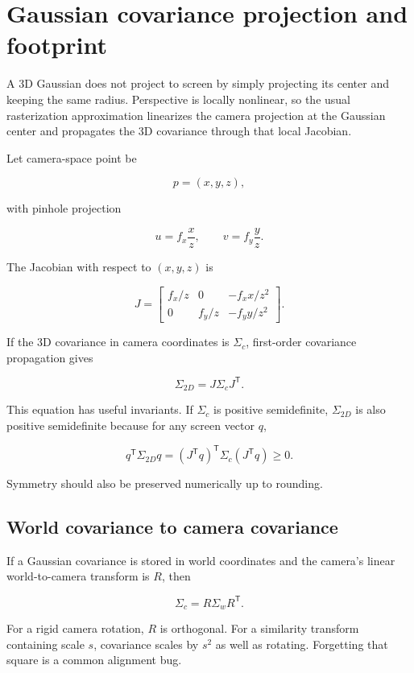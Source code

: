 \hypertarget{appendix-24269cb6977c}{}
\section{Gaussian covariance projection and footprint}\label{appendix-24269cb6977c-gaussian-covariance-projection-and-footprint}

A 3D Gaussian does not project to screen by simply projecting its center and keeping the same radius. Perspective is locally nonlinear, so the usual rasterization approximation linearizes the camera projection at the Gaussian center and propagates the 3D covariance through that local Jacobian.

Let camera-space point be

\[
p=(x,y,z),
\]

with pinhole projection

\[
u=f_x\frac{x}{z},
\qquad
v=f_y\frac{y}{z}.
\]

The Jacobian with respect to \((x,y,z)\) is

\[
J=
\begin{bmatrix}
f_x/z & 0 & -f_xx/z^2\\
0 & f_y/z & -f_yy/z^2
\end{bmatrix}.
\]

If the 3D covariance in camera coordinates is \(\Sigma_c\), first-order covariance propagation gives

\[
\Sigma_{2D}=J\Sigma_cJ^{\mathsf T}.
\]

This equation has useful invariants. If \(\Sigma_c\) is positive semidefinite, \(\Sigma_{2D}\) is also positive semidefinite because for any screen vector \(q\),

\[
q^{\mathsf T}\Sigma_{2D}q
=
(J^{\mathsf T}q)^{\mathsf T}\Sigma_c(J^{\mathsf T}q)
\ge0.
\]

Symmetry should also be preserved numerically up to rounding.

\subsection{World covariance to camera covariance}\label{appendix-24269cb6977c-world-covariance-to-camera-covariance}

If a Gaussian covariance is stored in world coordinates and the camera's linear world-to-camera transform is \(R\), then

\[
\Sigma_c=R\Sigma_wR^{\mathsf T}.
\]

For a rigid camera rotation, \(R\) is orthogonal. For a similarity transform containing scale \(s\), covariance scales by \(s^2\) as well as rotating. Forgetting that square is a common alignment bug.

